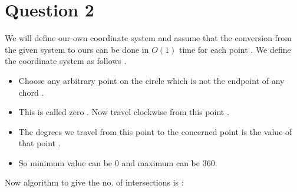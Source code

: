 \documentclass{article}
\begin{document}
\section*{Question 2}
We will define our own coordinate system and assume that the conversion from the given system to ours can be done in $O(1)$ time for each point . We define the coordinate system as follows . 
\begin{itemize}
\item Choose any arbitrary point on the circle which is not the endpoint of any chord .
\item This is called zero . Now travel clockwise from this point .
\item The degrees we travel from this point to the concerned point is the value of that point . 
\item So minimum value can be 0 and maximum can be 360. 
\end{itemize}
Now algorithm to give the no. of intersections is : \\
\end{document}
